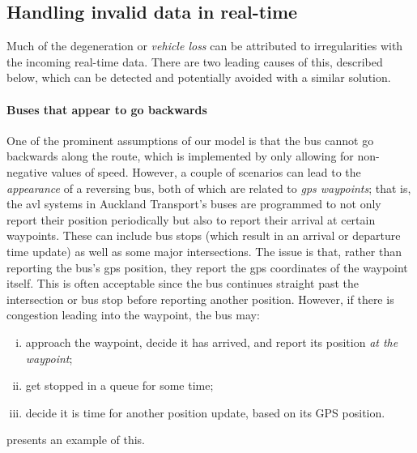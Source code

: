 \subsection{Handling invalid data in real-time}
\label{sec:data_issues}

Much of the degeneration or \emph{vehicle loss} can be attributed to irregularities with the incoming real-time data. There are two leading causes of this, described below, which can be detected and potentially avoided with a similar solution.


\paragraph{Buses that appear to go backwards}

One of the prominent assumptions of our model is that the bus cannot go backwards along the route, which is implemented by only allowing for non-negative values of speed. However, a couple of scenarios can lead to the \emph{appearance} of a reversing bus, both of which are related to \emph{\gls{gps} waypoints}; that is, the \gls{avl} systems in Auckland Transport's buses are programmed to not only report their position periodically but also to report their arrival at certain waypoints. These can include bus stops (which result in an arrival or departure time update) as well as some major intersections. The issue is that, rather than reporting the bus's \gls{gps} position, they report the \gls{gps} coordinates of the waypoint itself. This is often acceptable since the bus continues straight past the intersection or bus stop before reporting another position. However, if there is congestion leading into the waypoint, the bus may:
\begin{enumerate}[i.]
\item approach the waypoint, decide it has arrived, and report its position \emph{at the waypoint};
\item get stopped in a queue for some time;
\item decide it is time for another position update, based on its GPS position.
\end{enumerate}
 presents an example of this.

